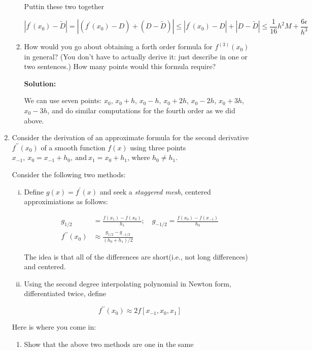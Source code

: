 \documentclass[12pt]{article}
\newcommand{\abs}[1]{\left| #1 \right|}
\begin{document}
\begin{enumerate}
\begin{enumerate}
Puttin these two together

\[
\abs{f^{\prime}(x_{0}) - \widetilde{D}} = \abs{(f^{\prime}(x_{0}) - D) + (D - \widetilde{D})} \leq \abs{f^{\prime}(x_{0}) - D} + \abs{D - \widetilde{D}} \leq \frac{1}{16}h^{2}M + \frac{6\epsilon}{h^{3}}
\]

\item How would you go about obtaining a forth order formula for $f^{(3)}(x_{0})$ in general? (You don't have to actually derive it: just describe in one or two sentences.) How many points would this formula require?

{\bf Solution:}

We can use seven points: $x_{0}$, $x_{0} + h$, $x_{0} - h$, $x_{0} + 2h$, $x_{0} - 2h$, $x_{0} + 3h$, $x_{0} - 3h$, and do similar computations for the fourth order as we did above.
\end{enumerate}

\item Consider the derivation of an approximate formula for the second derivative $f^{\prime \prime}(x_{0})$ of a smooth function $f(x)$ using three points $x_{-1},\ x_{0}=x_{-1} + h_{0},\ \text{and}\ x_{1}=x_{0}+h_{1}$, where $h_{0} \neq h_{1}$. 

Consider the following two methods:

\begin{enumerate}[i.]
\item Define $g(x) = f^{\prime}(x)$ and seek a {\em staggered mesh}, centered approximiations as follows:

\begin{align*}
g_{1/2} &= \frac{f(x_{1}) - f(x_{0})}{h_{1}};\quad g_{-1/2} = \frac{f(x_{0}) - f(x_{-1})}{h_{0}}\\
f^{\prime \prime}(x_{0}) &\approx \frac{g_{1/2} - g_{-1/2}}{(h_{0} + h_{1})/2}
\end{align*}

The idea is that all of the differences are short(i.e., not long differences) and centered.

\item Using the second degree interpolating polynomial in Newton form, differentiated twice, define

\[
f^{\prime \prime}(x_{0}) \approx 2f[x_{-1}, x_{0}, x_{1}]
\]

\end{enumerate}

Here is where you come in:

\begin{enumerate}
\item Show that the above two methods are one in the same


\end{enumerate}
\end{enumerate}
\end{document}
